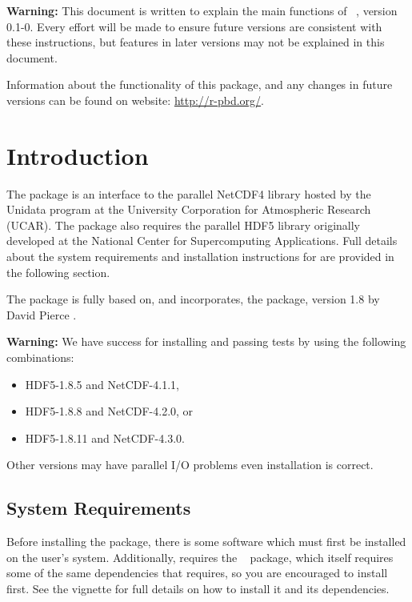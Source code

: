 {\color{red} \bf Warning:} This document is written to explain the main
functions of ~\citep{Ostrouchov2012pbdNCDF4package},
version 0.1-0.
Every effort will be made to ensure future versions are consistent with
these instructions, but features in later versions may not be explained
in this document.

Information about the functionality of this package,
and any changes in future versions can be found on website:
\url{http://r-pbd.org/}.

\section{Introduction}
\label{sec:quick_start}

The  package is an interface to the parallel NetCDF4 library \citep{netcdf} hosted by the Unidata program at the University Corporation for Atmospheric Research (UCAR). The package also requires the parallel HDF5 library \citep{hdf5} originally developed at the National Center for Supercomputing Applications. Full details about the system requirements and installation instructions for  are provided in the following section.

The  package is fully based on, and incorporates, the  package, version 1.8 by David Pierce \citep{ncdf4}.  

{\color{red} \bf Warning:}
We have success for installing and passing tests by using the following
combinations:
\begin{itemize}
\item HDF5-1.8.5 and NetCDF-4.1.1,
\item HDF5-1.8.8 and NetCDF-4.2.0, or
\item HDF5-1.8.11 and NetCDF-4.3.0.
\end{itemize}
Other versions may have parallel I/O problems even installation is correct.


\subsection[System Requirements]{System Requirements}
\label{sec:system_requirements}

Before installing the  package, there is some software which must first be installed on the user's system.  Additionally,  requires the ~\citep{Chen2012pbdMPIpackage} package, which itself requires some of the same dependencies that  requires, so you are encouraged to install  first.  See the  vignette \citep{Chen2012pbdMPIvignette} for full details on how to install it and its dependencies.

